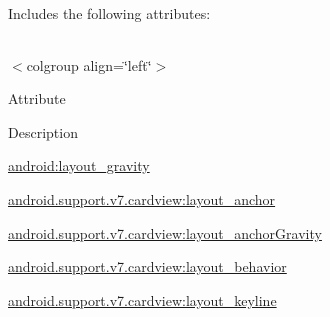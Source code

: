 Includes the following attributes\+:

\tabulinesep=1mm
\begin{longtabu} spread 0pt [c]{*{0}{|X[-1]}|}
\hline
\end{longtabu}
$<$colgroup align=\char`\"{}left\char`\"{}$>$ 

Attribute

Description 

{\ttfamily \hyperlink{classandroid_1_1support_1_1v7_1_1cardview_1_1R_1_1styleable_a7b843781d69c0606812c7b42334fffc0}{android\+:layout\+\_\+gravity}}

{\ttfamily \hyperlink{classandroid_1_1support_1_1v7_1_1cardview_1_1R_1_1styleable_a9b8fc3c3e83fa23e3b7600c6fac01f94}{android.\+support.\+v7.\+cardview\+:layout\+\_\+anchor}}

{\ttfamily \hyperlink{classandroid_1_1support_1_1v7_1_1cardview_1_1R_1_1styleable_a45b105447f04b1d7316dfedc36cf454f}{android.\+support.\+v7.\+cardview\+:layout\+\_\+anchor\+Gravity}}

{\ttfamily \hyperlink{classandroid_1_1support_1_1v7_1_1cardview_1_1R_1_1styleable_a7b12af163a68314e93350a2fddb194d5}{android.\+support.\+v7.\+cardview\+:layout\+\_\+behavior}}

{\ttfamily \hyperlink{classandroid_1_1support_1_1v7_1_1cardview_1_1R_1_1styleable_a8438ddb43a953883a300596ca7b1f39e}{android.\+support.\+v7.\+cardview\+:layout\+\_\+keyline}}

